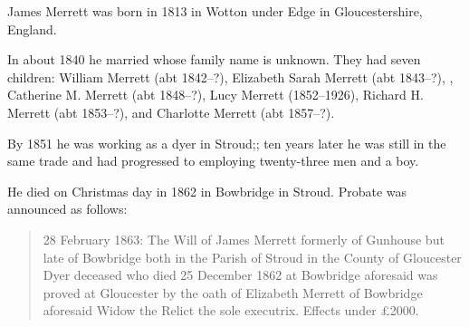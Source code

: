 
James Merrett\cite{HH-MMM-marriage} was born in 1813 in Wotton under Edge in Gloucestershire, England.

In about 1840 he married  whose family name is unknown.
They had seven children: William Merrett (abt 1842--?), Elizabeth Sarah Merrett (abt 1843--?), , Catherine M. Merrett (abt 1848--?), Lucy Merrett (1852--1926), Richard H. Merrett (abt 1853--?), and Charlotte Merrett (abt 1857--?). 

By 1851 he was working as a dyer in Stroud;\cite{Census1851Merrett}; ten years later he was still in the same trade and had progressed to employing twenty-three men and a boy.\cite{Census1861Merrett}

He died on Christmas day in 1862 in Bowbridge in Stroud. Probate was announced as follows:\cite{JamesMerrettProbate}

\begin{quotation}
28 February 1863: The Will of James Merrett formerly of Gunhouse but late of Bowbridge both in the Parish of Stroud in the County of Gloucester Dyer deceased who died 25 December 1862 at Bowbridge aforesaid was proved at Gloucester by the oath of Elizabeth Merrett of Bowbridge aforesaid Widow the Relict the sole executrix. Effects under \pounds2000.
\end{quotation}
